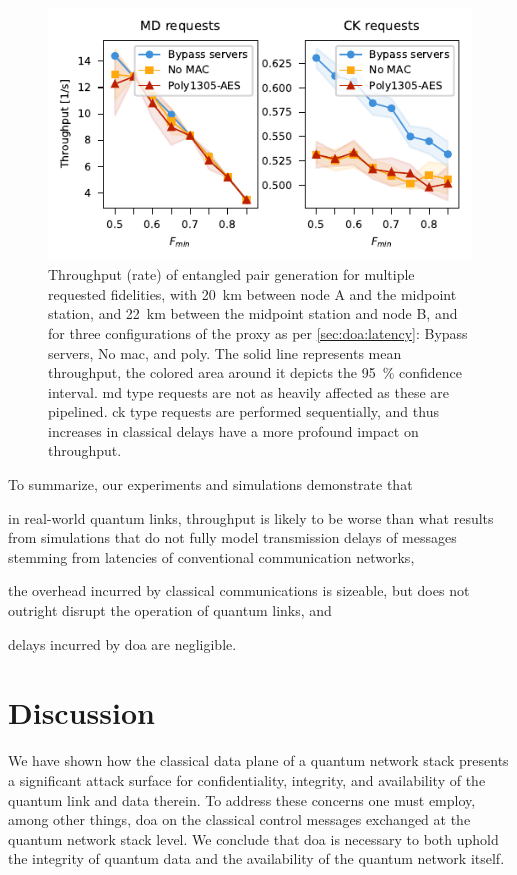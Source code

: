 \begin{figure}[t]
    \centering
    \includegraphics[width=0.6\linewidth]{figures/throughput-vs-fidelity.pdf}
    \caption{
        Throughput (rate) of entangled pair generation for multiple requested fidelities, with
        \qty{20}{\km} between node A and the midpoint station, and \qty{22}{\km} between the
        midpoint station and node B, and for three configurations of the proxy as per
        \cref{sec:doa:latency}: Bypass servers, No \acrshort{mac}, and \acrshort{poly}. The solid line
        represents mean throughput, the colored area around it depicts the \qty{95}{\percent}
        confidence interval. \Acrfull{md} type requests are not as heavily affected as these are
        pipelined. \Acrfull{ck} type requests are performed sequentially, and thus increases in
        classical delays have a more profound impact on throughput.
    }
    \label{fig:results-fidelity}
\end{figure}

To summarize, our experiments and simulations demonstrate that
%
\begin{inlinelist}
    \item in real-world quantum links, throughput is likely to be worse than what results from
          simulations that do not fully model transmission delays of messages stemming from
          latencies of conventional communication networks,
    \item the overhead incurred by classical communications is sizeable, but does not outright
          disrupt the operation of quantum links, and
    \item delays incurred by \acrlong{doa} are negligible.
\end{inlinelist}

\section{Discussion}

We have shown how the classical data plane of a quantum network stack presents a significant attack
surface for confidentiality, integrity, and availability of the quantum link and data therein. To
address these concerns one must employ, among other things, \acrlong{doa} on the classical control
messages exchanged at the quantum network stack level. We conclude that \acrlong{doa} is necessary
to both uphold the integrity of quantum data and the availability of the quantum network itself.


